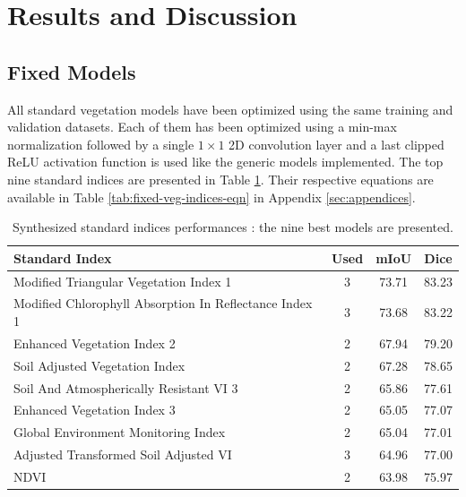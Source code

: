 \documentclass[../thesis.tex]{subfiles}
\begin{document}
	\newpage
	\section{Results and Discussion}
	\label{sec:results}
	
	\subsection{Fixed Models} All standard vegetation models have been optimized using the same training and validation datasets. Each of them has been optimized using a min-max normalization followed by a single $1\times1$ 2D convolution layer and a last clipped ReLU activation function is used like the generic models implemented. The top nine standard indices are presented in Table \ref{tab:fixed-veg-indices}. Their respective equations are available in Table \ref{tab:fixed-veg-indices-eqn} in Appendix \ref{sec:appendices}.
	
	
	\begin{table}[H]
		\begin{tabularx}{\linewidth}{X c c c}
			\hline
			\textbf{Standard Index} & \textbf{Used}  \boldmath{$\rho$} &  \textbf{mIoU} &  \textbf{Dice} \\
			\hline
			Modified Triangular Vegetation Index 1                 & 3 & \colorbox{green!50}{73.71} & \colorbox{green!50}{83.23} \\
			Modified Chlorophyll Absorption In Reflectance Index 1 & 3 & 73.68 & 83.22 \\
			Enhanced Vegetation Index 2                            & 2 & 67.94 & 79.20 \\
			Soil Adjusted Vegetation Index                         & 2 & 67.28 & 78.65 \\
			Soil And Atmospherically Resistant VI 3  			   & 2 & 65.86 & 77.61 \\
			Enhanced Vegetation Index 3                            & 2 & 65.05 & 77.07 \\
			Global Environment Monitoring Index                    & 2 & 65.04 & 77.01 \\
			Adjusted Transformed Soil Adjusted VI                  & 3 & 64.96 & 77.00 \\
			NDVI                                                   & 2 & \colorbox{orange!50}{63.98} & \colorbox{orange!50}{75.97} \\
			\hline
		\end{tabularx}
		\caption{ {Synthesized} standard indices performances : the nine best models are presented.}
		\label{tab:fixed-veg-indices}
	\end{table}
\end{document}
